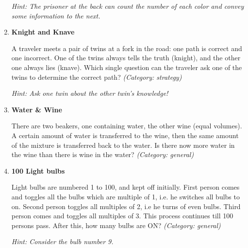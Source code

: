\begin{enumerate}
\small\emph{Hint: The prisoner at the back can count the number of each color and convey some information to the next.}





\item \textbf{Knight and Knave}

A traveler meets a pair of twins at a fork in the road: one path is correct and one incorrect. One of the twins always tells the truth (knight), and the other one always lies (knave). Which single question can the traveler ask one of the twins to determine the correct path?
\small\emph{(Category: strategy)}

\small\emph{Hint: Ask one twin about the other twin's knowledge!}





\item \textbf{Water \& Wine}

There are two beakers, one containing water, the other wine (equal volumes). A certain amount of water is transferred to the wine, then the same amount of the mixture is transferred back to the water. Is there now more water in the wine than there is wine in the water?
\small\emph{(Category: general)}




\item \textbf{100 Light bulbs}

Light bulbs are numbered 1 to 100, and kept off initially. First person comes and toggles all the bulbs which are multiple of 1, i.e. he switches all bulbs to on. Second person toggles all multiples of 2, i.e he turns of even bulbs. Third person comes and toggles all multiples of 3. This process continues till 100 persons pass. After this, how many bulbs are  ON?
\small\emph{(Category: general)}

\small\emph{Hint: Consider the bulb number 9.}


\end{enumerate}
